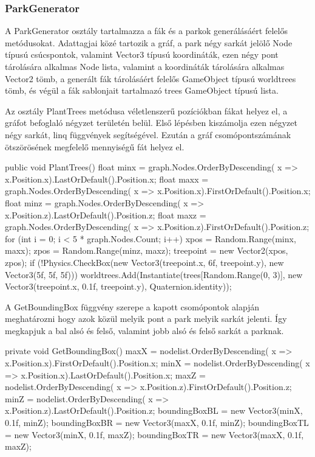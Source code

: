 \subsubsection{ParkGenerator}
A ParkGenerator osztály tartalmazza a fák és a parkok generálásáért felelős metódusokat. Adattagjai közé tartozik a gráf, a park négy sarkát jelölő Node típusú csúcspontok, valamint Vector3 típusú koordináták, ezen négy pont tárolására alkalmas Node lista, valamint a koordináták tárolására alkalmas Vector2 tömb, a generált fák tárolásáért felelős GameObject típusú worldtrees tömb, és végül a fák sablonjait tartalmazó trees GameObject típusú lista.

Az osztály PlantTrees metódusa  véletlenszerű pozíciókban fákat helyez el, a gráfot befoglaló négyzet területén belül. Első lépésben kiszámolja ezen négyzet négy sarkát, linq függvények segítségével. Ezután a gráf csomópontszámának ötszörösének megfelelő mennyiségű fát helyez el.
\begin{cpp}
public void PlantTrees()
    {
        float minx = graph.Nodes.OrderByDescending(
        x => x.Position.x).LastOrDefault().Position.x;
        float maxx = graph.Nodes.OrderByDescending(
        x => x.Position.x).FirstOrDefault().Position.x;
        float minz = graph.Nodes.OrderByDescending(
        x => x.Position.z).LastOrDefault().Position.z;
        float maxz = graph.Nodes.OrderByDescending(
        x => x.Position.z).FirstOrDefault().Position.z;
        for (int i = 0; i < 5 * graph.Nodes.Count; i++)
        {
            xpos = Random.Range(minx, maxx);
            zpos = Random.Range(minz, maxz);
            treepoint = new Vector2(xpos, zpos);
            if (!Physics.CheckBox(new Vector3(treepoint.x, 6f, 
            treepoint.y), new Vector3(5f, 5f, 5f)))
            {
                worldtrees.Add(Instantiate(trees[Random.Range(0, 3)], 
                new Vector3(treepoint.x, 0.1f, treepoint.y), 
                Quaternion.identity));
            }
        }
    }
\end{cpp}
A GetBoundingBox függvény szerepe a kapott csomópontok alapján meghatározni hogy azok közül melyik pont a park melyik sarkát jelenti. Így megkapjuk a bal alsó és felső, valamint jobb alsó és felső sarkát a parknak.
\begin{cpp}
private void GetBoundingBox()
    {
        maxX = nodelist.OrderByDescending(
        x => x.Position.x).FirstOrDefault().Position.x;
        minX = nodelist.OrderByDescending(
        x => x.Position.x).LastOrDefault().Position.x;
        maxZ = nodelist.OrderByDescending(
        x => x.Position.z).FirstOrDefault().Position.z;
        minZ = nodelist.OrderByDescending(
        x => x.Position.z).LastOrDefault().Position.z;
        boundingBoxBL = new Vector3(minX, 0.1f, minZ);
        boundingBoxBR = new Vector3(maxX, 0.1f, minZ);
        boundingBoxTL = new Vector3(minX, 0.1f, maxZ);
        boundingBoxTR = new Vector3(maxX, 0.1f, maxZ);
    }
\end{cpp}
